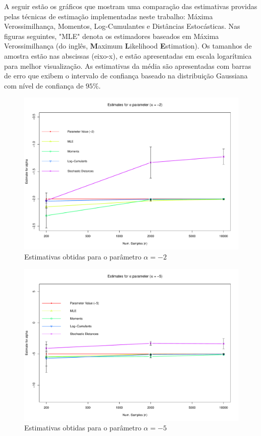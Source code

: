 A seguir estão os gráficos que mostram uma comparação das estimativas providas pelas técnicas de estimação implementadas neste trabalho: Máxima Verossimilhança, Momentos, Log-Cumulantes e Distâncias Estocásticas. Nas figuras seguintes, "MLE" denota os estimadores baseados em Máxima Verossimilhança (do inglês, \textbf{M}aximum \textbf{L}ikelihood \textbf{E}stimation). Os tamanhos de amostra estão nas abscissas (eixo-x), e estão apresentadas em escala logarítmica para melhor visualização. As estimativas da média são apresentadas com barras de erro que exibem o intervalo de confiança baseado na distribuição Gaussiana com nível de confiança de $95\%$.
\begin{figure}[H]
     \centering
     \includegraphics[scale=0.5]{plots/ComparisonAlpha-2.pdf}
     \caption{Estimativas obtidas para o parâmetro $\alpha = -2$}
     \label{graf_5}
\end{figure}
\begin{figure}[H]
     \centering
     \includegraphics[scale=0.5]{plots/ComparisonAlpha-5.pdf}
     \caption{Estimativas obtidas para o parâmetro $\alpha = -5$}
     \label{graf_6}
\end{figure}
